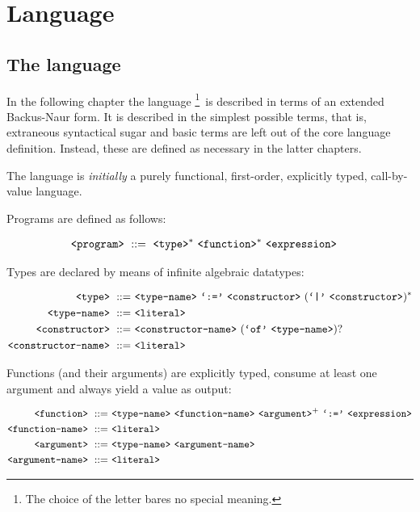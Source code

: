 \chapter{Language}

\section{The language }

In the following chapter the language \footnote{The choice of the
letter  bares no special meaning.}\ is described in terms of an
extended Backus-Naur form\footnotemark. It is described in the simplest
possible terms, that is, extraneous syntactical sugar and basic terms are left
out of the core language definition.  Instead, these are defined as necessary
in the latter chapters.


The language  is \emph{initially} a purely functional, first-order,
explicitly typed, call-by-value language.

Programs are defined as follows:

\begin{align}
\text{{\ttfamily<program>}}\ &::=\ \text{{\ttfamily<type>}}^*\ \text{{\ttfamily<function>}}^*
\ \text{{\ttfamily<expression>}}
\end{align}

Types are declared by means of infinite algebraic datatypes:

\begin{align}
\text{{\ttfamily<type>}}\ ::=&\ \text{{\ttfamily<type-name>}}
\ \text{{\ttfamily`:='}}\ \text{{\ttfamily<constructor>}}\ (\text{{\ttfamily`|'}}
\ \text{{\ttfamily<constructor>}})^*\\
\text{{\ttfamily<type-name>}}\ ::=&\ \text{{\ttfamily<literal>}}\\
\text{{\ttfamily<constructor>}}\ ::=&\ \text{{\ttfamily<constructor-name>}}
\ (\text{{\ttfamily`of'}}\ \text{{\ttfamily<type-name>}})?\\
\text{{\ttfamily<constructor-name>}}\ ::=&\ \text{{\ttfamily<literal>}}
\end{align}

Functions (and their arguments) are explicitly typed, consume at least one
argument and always yield a value as output:

\begin{align}
\nonterm{function}\ ::=&\ \nonterm{type-name}\ \nonterm{function-name}
\ \nonterm{argument}^+\ \term{:=}\ \nonterm{expression}\\
\nonterm{function-name}\ ::=&\ \nonterm{literal}\\
\nonterm{argument}\ ::=&\ \nonterm{type-name}\
\nonterm{argument-name}\\
\nonterm{argument-name}\ ::=&\ \nonterm{literal}
\end{align}

